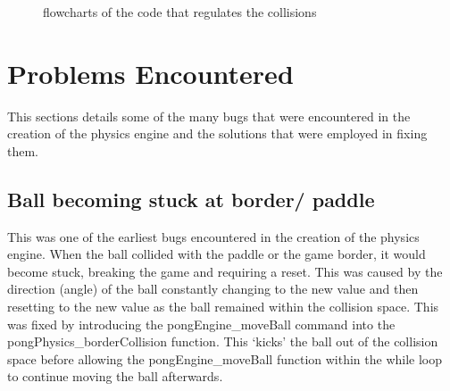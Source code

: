 \documentclass[a4paper,12pt]{article}
\begin{document}
\begin{flushleft}
\begin{figure}[H]
    \qquad
    \caption{flowcharts of the code that regulates the collisions}%
    \label{fig:example}%
\end{figure}
\end{flushleft}
\newpage
\section{Problems Encountered}
\begin{flushleft}
This sections details some of the many bugs that were encountered in the creation of the physics engine and the solutions that were employed in fixing them.
\end{flushleft}
\subsection{Ball becoming stuck at border/ paddle}
\begin{flushleft}
This was one of the earliest bugs encountered in the creation of the physics engine. When the ball collided with the paddle or the game border, it would become stuck, breaking the game and requiring a reset. This was caused by the direction (angle) of the ball constantly changing to the new value and then resetting to the new value as the ball remained within the collision space. This was fixed by introducing the pongEngine\_moveBall command into the pongPhysics\_borderCollision function. This ‘kicks’ the ball out of the collision space before allowing the pongEngine\_moveBall function within the while loop to continue moving the ball afterwards.
\end{flushleft}
\end{document}
